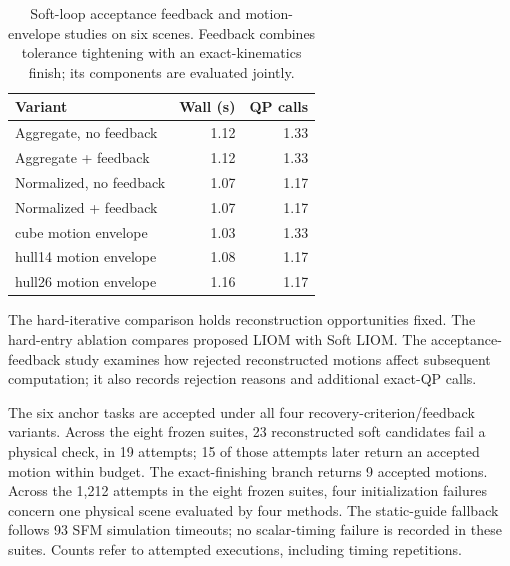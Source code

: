 \begin{table}[htbp]
\caption{Soft-loop acceptance feedback and motion-envelope studies on six scenes. Feedback combines tolerance tightening with an exact-kinematics finish; its components are evaluated jointly.\label{tab:mechanism-new}}
\centering\small
\begin{tabular}{lrr}\toprule
Variant & Wall (s) & QP calls\\\midrule
Aggregate, no feedback & 1.12 & 1.33\\
Aggregate + feedback & 1.12 & 1.33\\
Normalized, no feedback & 1.07 & 1.17\\
Normalized + feedback & 1.07 & 1.17\\
cube motion envelope & 1.03 & 1.33\\
hull14 motion envelope & 1.08 & 1.17\\
hull26 motion envelope & 1.16 & 1.17\\
\bottomrule\end{tabular}
\end{table}
The hard-iterative comparison holds reconstruction opportunities fixed. The hard-entry ablation compares proposed LIOM with Soft LIOM. The acceptance-feedback study examines how rejected reconstructed motions affect subsequent computation; it also records rejection reasons and additional exact-QP calls.



The six anchor tasks are accepted under all four recovery-criterion/feedback variants. Across the eight frozen suites, 23 reconstructed soft candidates fail a physical check, in 19 attempts; 15 of those attempts later return an accepted motion within budget. The exact-finishing branch returns 9 accepted motions. Across the 1,212 attempts in the eight frozen suites, four initialization failures concern one physical scene evaluated by four methods. The static-guide fallback follows 93 SFM simulation timeouts; no scalar-timing failure is recorded in these suites. Counts refer to attempted executions, including timing repetitions.
